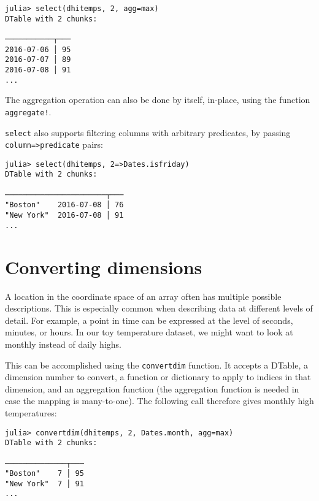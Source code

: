 \documentclass{memoir}
\begin{document}
\begin{verbatim}
julia> select(dhitemps, 2, agg=max)
DTable with 2 chunks:

───────────┬───
2016-07-06 │ 95
2016-07-07 │ 89
2016-07-08 │ 91
...
\end{verbatim}



The aggregation operation can also be done by itself, in-place, using the function \texttt{aggregate!}.



\texttt{select} also supports filtering columns with arbitrary predicates, by passing \texttt{column=>predicate} pairs:




\begin{verbatim}
julia> select(dhitemps, 2=>Dates.isfriday)
DTable with 2 chunks:

───────────────────────┬───
"Boston"    2016-07-08 │ 76
"New York"  2016-07-08 │ 91
...
\end{verbatim}



\hypertarget{2209212914089178720}{}


\section{Converting dimensions}



A location in the coordinate space of an array often has multiple possible descriptions. This is especially common when describing data at different levels of detail. For example, a point in time can be expressed at the level of seconds, minutes, or hours. In our toy temperature dataset, we might want to look at monthly instead of daily highs.



This can be accomplished using the \texttt{convertdim} function. It accepts a DTable, a dimension number to convert, a function or dictionary to apply to indices in that dimension, and an aggregation function (the aggregation function is needed in case the mapping is many-to-one). The following call therefore gives monthly high temperatures:




\begin{verbatim}
julia> convertdim(dhitemps, 2, Dates.month, agg=max)
DTable with 2 chunks:

──────────────┬───
"Boston"    7 │ 95
"New York"  7 │ 91
...
\end{verbatim}
\end{document}
